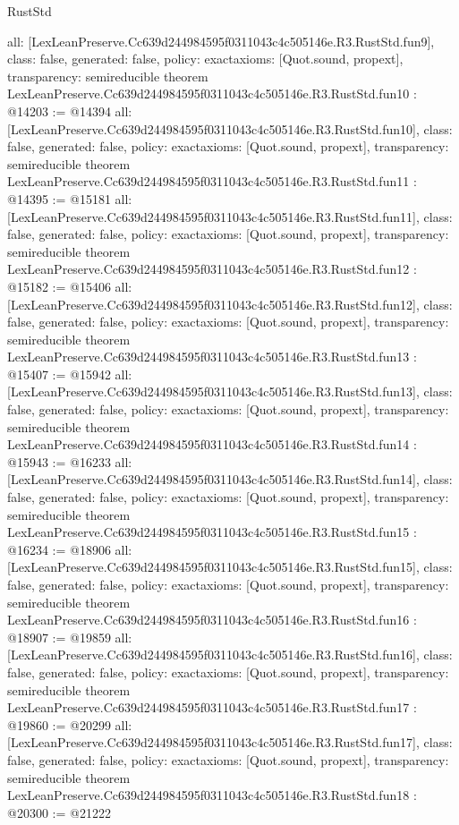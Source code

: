 \begin{lexlean}{RustStd}
\begin{coremodule}
{  all: [LexLeanPreserve.Cc639d244984595f0311043c4c505146e.R3.RustStd.fun9],
  class: false,
  generated: false,
  policy: exact{axioms: [Quot.sound, propext]},
  transparency: semireducible
}
theorem LexLeanPreserve.Cc639d244984595f0311043c4c505146e.R3.RustStd.fun10 : @14203 := @14394 {
  all: [LexLeanPreserve.Cc639d244984595f0311043c4c505146e.R3.RustStd.fun10],
  class: false,
  generated: false,
  policy: exact{axioms: [Quot.sound, propext]},
  transparency: semireducible
}
theorem LexLeanPreserve.Cc639d244984595f0311043c4c505146e.R3.RustStd.fun11 : @14395 := @15181 {
  all: [LexLeanPreserve.Cc639d244984595f0311043c4c505146e.R3.RustStd.fun11],
  class: false,
  generated: false,
  policy: exact{axioms: [Quot.sound, propext]},
  transparency: semireducible
}
theorem LexLeanPreserve.Cc639d244984595f0311043c4c505146e.R3.RustStd.fun12 : @15182 := @15406 {
  all: [LexLeanPreserve.Cc639d244984595f0311043c4c505146e.R3.RustStd.fun12],
  class: false,
  generated: false,
  policy: exact{axioms: [Quot.sound, propext]},
  transparency: semireducible
}
theorem LexLeanPreserve.Cc639d244984595f0311043c4c505146e.R3.RustStd.fun13 : @15407 := @15942 {
  all: [LexLeanPreserve.Cc639d244984595f0311043c4c505146e.R3.RustStd.fun13],
  class: false,
  generated: false,
  policy: exact{axioms: [Quot.sound, propext]},
  transparency: semireducible
}
theorem LexLeanPreserve.Cc639d244984595f0311043c4c505146e.R3.RustStd.fun14 : @15943 := @16233 {
  all: [LexLeanPreserve.Cc639d244984595f0311043c4c505146e.R3.RustStd.fun14],
  class: false,
  generated: false,
  policy: exact{axioms: [Quot.sound, propext]},
  transparency: semireducible
}
theorem LexLeanPreserve.Cc639d244984595f0311043c4c505146e.R3.RustStd.fun15 : @16234 := @18906 {
  all: [LexLeanPreserve.Cc639d244984595f0311043c4c505146e.R3.RustStd.fun15],
  class: false,
  generated: false,
  policy: exact{axioms: [Quot.sound, propext]},
  transparency: semireducible
}
theorem LexLeanPreserve.Cc639d244984595f0311043c4c505146e.R3.RustStd.fun16 : @18907 := @19859 {
  all: [LexLeanPreserve.Cc639d244984595f0311043c4c505146e.R3.RustStd.fun16],
  class: false,
  generated: false,
  policy: exact{axioms: [Quot.sound, propext]},
  transparency: semireducible
}
theorem LexLeanPreserve.Cc639d244984595f0311043c4c505146e.R3.RustStd.fun17 : @19860 := @20299 {
  all: [LexLeanPreserve.Cc639d244984595f0311043c4c505146e.R3.RustStd.fun17],
  class: false,
  generated: false,
  policy: exact{axioms: [Quot.sound, propext]},
  transparency: semireducible
}
theorem LexLeanPreserve.Cc639d244984595f0311043c4c505146e.R3.RustStd.fun18 : @20300 := @21222 {
}
\end{coremodule}
\end{lexlean}
